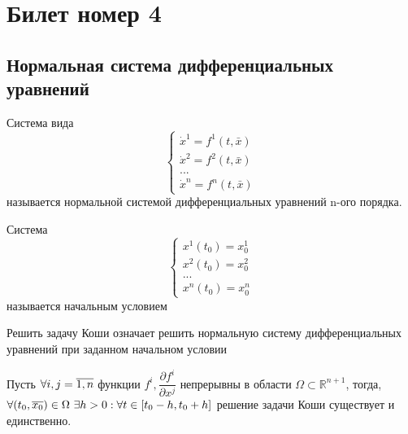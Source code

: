 



\section{Билет номер 4}
	\subsection{Нормальная система дифференциальных уравнений}
	
	\begin{definition}
		Система вида
		\begin{equation}
			\label{equ:norm-sys}
			\begin{cases*}
				\dot{x}^1 = f^1(t, \bar{x}) \\
				\dot{x}^2 = f^2(t, \bar{x}) \\
				... \\
				\dot{x}^n = f^n(t, \bar{x})
			\end{cases*}
		\end{equation}
		называется нормальной системой дифференциальных уравнений n-ого порядка.
		
	\end{definition}

	\begin{definition}
		Система
		\begin{equation}
			\label{equ:init-cond}
			\begin{cases*}
				x^1(t_0) = x_0^1 \\
				x^2(t_0) = x_0^2 \\
				... \\
				x^n(t_0) = x_0^n
			\end{cases*}
		\end{equation}
		называется начальным условием
	\end{definition}	

	\begin{proposition}
		Решить задачу Коши означает решить нормальную систему дифференциальных уравнений при заданном начальном условии
	\end{proposition}
	
	\begin{theorem}
		Пусть $\forall i, j \hm= \overline{1, n}$ функции $f^i, \dfrac{\partial{f^i}}{\partial{x^j}}$ непрерывны в области $\Omega \subset \mathbb{R}^{n+1}$, тогда, $\forall (t_0, \overline{x_0}) \in \Omega \text{ } \exists h>0 : \forall t \hm\in [t_0-h, t_0+h]$ решение задачи Коши существует и единственно.
	\end{theorem}

